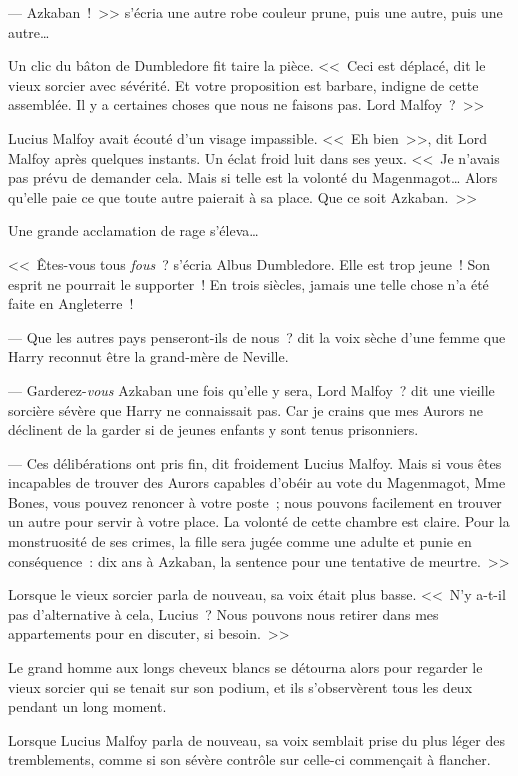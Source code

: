 --- Azkaban~!~>> s'écria une autre robe couleur prune, puis une autre, puis une autre…

Un clic du bâton de Dumbledore fit taire la pièce. <<~Ceci est déplacé, dit le vieux sorcier avec sévérité. Et votre proposition est barbare, indigne de cette assemblée. Il y a certaines choses que nous ne faisons pas. Lord Malfoy~?~>>

Lucius Malfoy avait écouté d'un visage impassible. <<~Eh bien~>>, dit Lord Malfoy après quelques instants. Un éclat froid luit dans ses yeux. <<~Je n'avais pas prévu de demander cela. Mais si telle est la volonté du Magenmagot… Alors qu'elle paie ce que toute autre paierait à sa place. Que ce soit Azkaban.~>>

Une grande acclamation de rage s'éleva…

<<~Êtes-vous tous \emph{fous}~? s'écria Albus Dumbledore. Elle est trop jeune~! Son esprit ne pourrait le supporter~! En trois siècles, jamais une telle chose n'a été faite en Angleterre~!

--- Que les autres pays penseront-ils de nous~? dit la voix sèche d'une femme que Harry reconnut être la grand-mère de Neville.

--- Garderez-\emph{vous} Azkaban une fois qu'elle y sera, Lord Malfoy~? dit une vieille sorcière sévère que Harry ne connaissait pas. Car je crains que mes Aurors ne déclinent de la garder si de jeunes enfants y sont tenus prisonniers.

--- Ces délibérations ont pris fin, dit froidement Lucius Malfoy. Mais si vous êtes incapables de trouver des Aurors capables d'obéir au vote du Magenmagot, Mme Bones, vous pouvez renoncer à votre poste~; nous pouvons facilement en trouver un autre pour servir à votre place. La volonté de cette chambre est claire. Pour la monstruosité de ses crimes, la fille sera jugée comme une adulte et punie en conséquence~: dix ans à Azkaban, la sentence pour une tentative de meurtre.~>>

Lorsque le vieux sorcier parla de nouveau, sa voix était plus basse. <<~N'y a-t-il pas d'alternative à cela, Lucius~? Nous pouvons nous retirer dans mes appartements pour en discuter, si besoin.~>>

Le grand homme aux longs cheveux blancs se détourna alors pour regarder le vieux sorcier qui se tenait sur son podium, et ils s'observèrent tous les deux pendant un long moment.

Lorsque Lucius Malfoy parla de nouveau, sa voix semblait prise du plus léger des tremblements, comme si son sévère contrôle sur celle-ci commençait à flancher.

